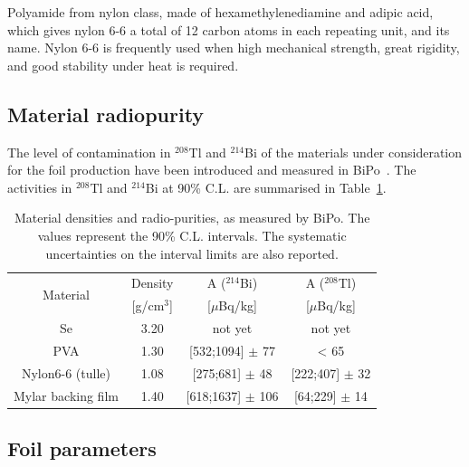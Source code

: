 \documentclass[main.tex]{subfiles}
\begin{document}
\NI Polyamide from nylon class, made of hexamethylenediamine and adipic acid, which gives nylon 6-6 a total of 12 carbon atoms in each repeating unit, and its name. Nylon 6-6 is frequently used when high mechanical strength, great rigidity, and good stability under heat is required.


\subsection{Material radiopurity}\label{sec:MaterialRadiopurity}


\NI The level of contamination in $^{\text{208}}$Tl and $^{\text{214}}$Bi of the materials under consideration for the foil production have been introduced and measured in BiPo~\cite{BiPoDetector}. The activities in $^{\text{208}}$Tl and $^{\text{214}}$Bi at 90\% C.L. are summarised in Table~\ref{tab:MeasuredBiPoAndDensity}.


\begin{table}[h!]
\centering
\begin{tabular}{c|c|c|c}
\toprule
\multirow{2}{*}{Material} & Density           &  A ($^{\text{214}}$Bi) & A ($^{\text{208}}$Tl) \\[0.1cm]
                          & [g/cm$^\text{3}$] & [$\mu$Bq/kg]           & [$\mu$Bq/kg] \\[0.1cm]
\hline
 Se                       & 3.20              & not yet                & not yet \\[0.1cm] 
\hline
PVA                       & 1.30              & [532;1094] $\pm$ 77 & < 65 \\ [0.1cm]
\hline
Nylon6-6 (tulle)          & 1.08              & [275;681] $\pm$ 48  & [222;407] $\pm$ 32 \\[0.1cm]
\hline
Mylar backing film        & 1.40              & [618;1637] $\pm$ 106 & [64;229] $\pm$ 14 \\ [0.1cm]    
\bottomrule                  
\end{tabular}
\caption{Material densities and radio-purities, as measured by BiPo. The values represent the 90\% C.L. intervals. The systematic uncertainties on the interval limits are also reported.}
\label{tab:MeasuredBiPoAndDensity}
\end{table}


\FloatBarrier


\subsection{Foil parameters}\label{sec:FoilParameters}
\end{document}
